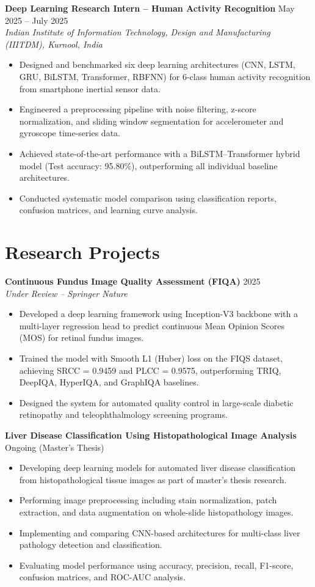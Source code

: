 \documentclass[a4paper,10pt]{article}
\begin{document}
\textbf{Deep Learning Research Intern -- Human Activity Recognition} \hfill May 2025 -- July 2025\\
\textit{Indian Institute of Information Technology, Design and Manufacturing (IIITDM), Kurnool, India}
\begin{itemize}
\item Designed and benchmarked six deep learning architectures (CNN, LSTM, GRU, BiLSTM, Transformer, RBFNN) for 6-class human activity recognition from smartphone inertial sensor data.
\item Engineered a preprocessing pipeline with noise filtering, z-score normalization, and sliding window segmentation for accelerometer and gyroscope time-series data.
\item Achieved state-of-the-art performance with a BiLSTM--Transformer hybrid model (Test accuracy: 95.80\%), outperforming all individual baseline architectures.
\item Conducted systematic model comparison using classification reports, confusion matrices, and learning curve analysis.
\end{itemize}


\section{Research Projects}

\textbf{Continuous Fundus Image Quality Assessment (FIQA)} \hfill 2025\\
\textit{Under Review -- Springer Nature}
\begin{itemize}
\item Developed a deep learning framework using Inception-V3 backbone with a multi-layer regression head to predict continuous Mean Opinion Scores (MOS) for retinal fundus images.
\item Trained the model with Smooth L1 (Huber) loss on the FIQS dataset, achieving SRCC = 0.9459 and PLCC = 0.9575, outperforming TRIQ, DeepIQA, HyperIQA, and GraphIQA baselines.
\item Designed the system for automated quality control in large-scale diabetic retinopathy and teleophthalmology screening programs.
\end{itemize}

\textbf{Liver Disease Classification Using Histopathological Image Analysis} \hfill Ongoing (Master's Thesis)
\begin{itemize}
\item Developing deep learning models for automated liver disease classification from histopathological tissue images as part of master's thesis research.
\item Performing image preprocessing including stain normalization, patch extraction, and data augmentation on whole-slide histopathology images.
\item Implementing and comparing CNN-based architectures for multi-class liver pathology detection and classification.
\item Evaluating model performance using accuracy, precision, recall, F1-score, confusion matrices, and ROC-AUC analysis.
\end{itemize}
\end{document}

